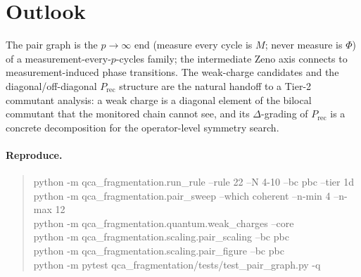 \documentclass[11pt]{article}
\newcommand{\Prec}{P_{\mathrm{rec}}}
\theoremstyle{plain}
\theoremstyle{definition}
\begin{document}
\section{Outlook}
The pair graph is the $p\to\infty$ end (measure every cycle is $M$; never measure
is $\Phi$) of a measurement-every-$p$-cycles family; the intermediate Zeno axis
connects to measurement-induced phase transitions. The weak-charge candidates and
the diagonal/off-diagonal $\Prec$ structure are the natural handoff to a Tier-2
commutant analysis: a weak charge is a diagonal element of the bilocal commutant
that the monitored chain cannot see, and its $\Delta$-grading of $\Prec$ is a
concrete decomposition for the operator-level symmetry search.

\paragraph{Reproduce.}
\begin{quote}\small\ttfamily
python -m qca\_fragmentation.run\_rule --rule 22 --N 4-10 --bc pbc --tier 1d\\
python -m qca\_fragmentation.pair\_sweep --which coherent --n-min 4 --n-max 12\\
python -m qca\_fragmentation.quantum.weak\_charges --core\\
python -m qca\_fragmentation.scaling.pair\_scaling --bc pbc\\
python -m qca\_fragmentation.scaling.pair\_figure --bc pbc\\
python -m pytest qca\_fragmentation/tests/test\_pair\_graph.py -q
\end{quote}
\end{document}
